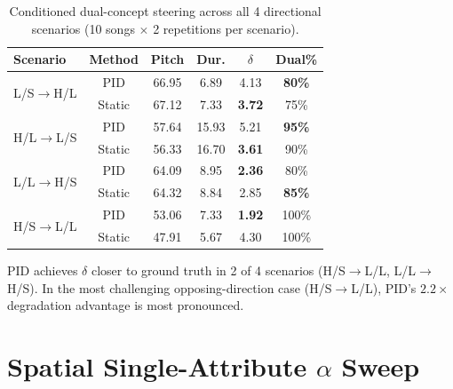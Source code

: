 \documentclass{article}
\theoremstyle{plain}
\begin{document}
\begin{table}[h]
  \caption{Conditioned dual-concept steering across all 4 directional scenarios (10 songs $\times$ 2 repetitions per scenario).}
  \label{tab:conditioned_full}
  \begin{center}
  \begin{small}
  \begin{tabular}{lccccc}
    \toprule
    Scenario & Method & Pitch & Dur. & $\delta$ & Dual\% \\
    \midrule
    \multirow{2}{*}{L/S$\to$H/L} & PID & 66.95 & 6.89 & 4.13 & \textbf{80\%} \\
    & Static & 67.12 & 7.33 & \textbf{3.72} & 75\% \\
    \midrule
    \multirow{2}{*}{H/L$\to$L/S} & PID & 57.64 & 15.93 & 5.21 & \textbf{95\%} \\
    & Static & 56.33 & 16.70 & \textbf{3.61} & 90\% \\
    \midrule
    \multirow{2}{*}{L/L$\to$H/S} & PID & 64.09 & 8.95 & \textbf{2.36} & 80\% \\
    & Static & 64.32 & 8.84 & 2.85 & \textbf{85\%} \\
    \midrule
    \multirow{2}{*}{H/S$\to$L/L} & PID & 53.06 & 7.33 & \textbf{1.92} & 100\% \\
    & Static & 47.91 & 5.67 & 4.30 & 100\% \\
    \bottomrule
  \end{tabular}
  \end{small}
  \end{center}
\end{table}

PID achieves $\delta$ closer to ground truth in 2 of 4 scenarios (H/S$\to$L/L, L/L$\to$H/S). In the most challenging opposing-direction case (H/S$\to$L/L), PID's $2.2{\times}$ degradation advantage is most pronounced.

\section{Spatial Single-Attribute $\alpha$ Sweep}
\label{app:alpha_sweep}
\end{document}
